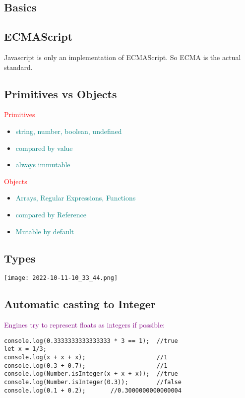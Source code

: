 \documentclass[main.tex,fontsize=6pt,paper=a4,paper=landscape,DIV=calc,]{scrartcl}
\begin{document}
\begin{multicols*}{4}

\section{Basics}

\subsection{ECMAScript} 
Javascript is only an implementation of ECMAScript. So ECMA is the actual standard.
 
\subsection{Primitives vs Objects}  
\textcolor{red}{Primitives}

\begin{itemize}
  \item \textcolor{teal}{string, number, boolean, undefined}
  \item \textcolor{teal}{compared by value}
  \item \textcolor{teal}{always immutable}
\end{itemize}
\vspace{2mm}
\textcolor{red}{Objects}
\begin{itemize}
  \item \textcolor{teal}{Arrays, Regular Expressions, Functions}
  \item \textcolor{teal}{compared by Reference}
  \item \textcolor{teal}{Mutable by default}
\end{itemize}


\subsection{Types} 
\texttt{[image: 2022-10-11-10\_33\_44.png]}

\subsection{Automatic casting to Integer}
\textcolor{purple}{Engines try to represent floats as integers if possible:}
\vspace{-2mm}
\begin{lstlisting}
console.log(0.3333333333333333 * 3 == 1);  //true
let x = 1/3;                               
console.log(x + x + x);                    //1
console.log(0.3 + 0.7);                    //1
console.log(Number.isInteger(x + x + x));  //true
console.log(Number.isInteger(0.3));        //false
console.log(0.1 + 0.2);       //0.3000000000000004


\end{lstlisting}
\end{multicols*}
\end{document}
